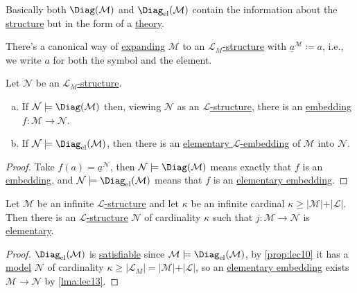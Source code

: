 \begin{intuition}
	Basically both \(\Diag(\mathcal{M} )\) and \(\Diag_{\mathrm{el} }(\mathcal{M} )\) contain the information about the \hyperref[def:structure]{structure} but in the form of a \hyperref[def:theory]{theory}.
\end{intuition}

\begin{notation}
	There's a canonical way of \hyperref[not:expansion]{expanding} \(\mathcal{M} \) to an \hyperref[def:structure]{\(\mathcal{L} _M\)-structure} with \(\underline{a}^{\mathcal{M}} \coloneqq a\), i.e., we write \(a\) for both the symbol and the element.
\end{notation}

\begin{lemma}\label{lma:lec13}
	Let \(\mathcal{N} \) be an \hyperref[def:structure]{\(\mathcal{L} _M\)-structure}.
	\begin{enumerate}[(a)]
		\item If \(\mathcal{N} \models \Diag(\mathcal{M} )\) then, viewing \(\mathcal{N} \) as an \hyperref[def:structure]{\(\mathcal{L} \)-structure}, there is an \hyperref[def:embedding]{embedding} \(f\colon \mathcal{M} \to \mathcal{N} \).
		\item If \(\mathcal{N} \models \Diag_{\mathrm{el} }(\mathcal{M} )\), then there is an \hyperref[def:elementary-embedding]{elementary \(\mathcal{L} \)-embedding} of \(\mathcal{M} \) into \(\mathcal{N} \).
	\end{enumerate}
\end{lemma}
\begin{proof}
	Take \(f(a) = \underline{a}^{\mathcal{N} } \), then \(\mathcal{N} \models \Diag(\mathcal{M} )\) means exactly that \(f\) is an \hyperref[def:embedding]{embedding}, and \(\mathcal{N} \models \Diag_{\mathrm{el} }(\mathcal{M} )\) means that \(f\) is an \hyperref[def:elementary-embedding]{elementary embedding}.
\end{proof}

\begin{theorem}\label{thm:upward-Lowenheim-Skolem}
	Let \(\mathcal{M} \) be an infinite \hyperref[def:structure]{\(\mathcal{L} \)-structure} and let \(\kappa \) be an infinite cardinal \(\kappa \geq \vert \mathcal{M}  \vert + \vert \mathcal{L} \vert \). Then there is an \hyperref[def:structure]{\(\mathcal{L} \)-structure} \(\mathcal{N} \) of cardinality \(\kappa \) such that \(j\colon \mathcal{M} \to \mathcal{N} \) is \hyperref[def:elementary-embedding]{elementary}.
\end{theorem}
\begin{proof}
	\(\Diag_{\mathrm{el} }(\mathcal{M} )\) is \hyperref[def:satisfiable]{satisfiable} since \(\mathcal{M} \models \Diag_{\mathrm{el} }(\mathcal{M} )\), by \autoref{prop:lec10} it has a \hyperref[def:model]{model} \(\mathcal{N} \) of cardinality \(\kappa \geq \vert \mathcal{L} _M \vert = \vert \mathcal{M} \vert + \vert \mathcal{L} \vert \), so an \hyperref[def:elementary-embedding]{elementary embedding} exists \(\mathcal{M} \to \mathcal{N} \) by \autoref{lma:lec13}.
\end{proof}

